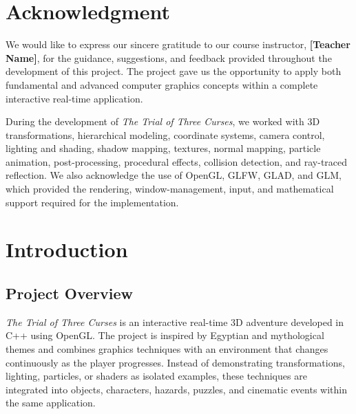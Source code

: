 \documentclass[11pt,a4paper]{article}
\begin{document}

\section*{Acknowledgment}

We would like to express our sincere gratitude to our course instructor,
\textbf{[Teacher Name]}, for the guidance, suggestions, and feedback provided
throughout the development of this project. The project gave us the opportunity
to apply both fundamental and advanced computer graphics concepts within a
complete interactive real-time application.

During the development of \textit{The Trial of Three Curses}, we worked with
3D transformations, hierarchical modeling, coordinate systems, camera control,
lighting and shading, shadow mapping, textures, normal mapping, particle
animation, post-processing, procedural effects, collision detection, and
ray-traced reflection. We also acknowledge the use of OpenGL, GLFW, GLAD, and
GLM, which provided the rendering, window-management, input, and mathematical
support required for the implementation.

\clearpage



\tableofcontents

\clearpage
\setcounter{page}{1}



\section{Introduction}

\subsection{Project Overview}

\textit{The Trial of Three Curses} is an interactive real-time 3D adventure
developed in C++ using OpenGL. The project is inspired by Egyptian and
mythological themes and combines graphics techniques with an environment that
changes continuously as the player progresses. Instead of demonstrating
transformations, lighting, particles, or shaders as isolated examples, these
techniques are integrated into objects, characters, hazards, puzzles, and
cinematic events within the same application.
\end{document}
